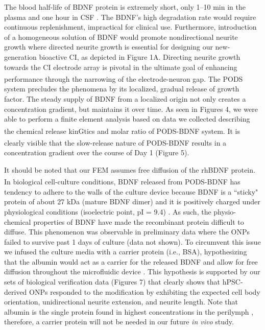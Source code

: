 \documentclass[review]{elsarticle}
\begin{document}
\indent The blood half-life of BDNF protein is extremely short, only 1–10 min in the plasma \cite{Poduslo1996,Sakane1997} and one hour in CSF \cite{Soderquist2009}. The BDNF's high degradation rate would require continuous replenishment, impractical for clinical use. Furthermore, introduction of a homogeneous solution of BDNF would promote nondirectional neurite growth where directed neurite growth is essential for designing our new-generation bioactive CI, as depicted in Figure 1A. Directing neurite growth towards the CI electrode array is pivotal in the ultimate goal of enhancing performance through the narrowing of the electrode-neuron gap. The PODS\textsuperscript{\textregistered} system precludes the phenomena by its localized, gradual release of growth factor. The steady supply of BDNF from a localized origin not only creates a concentration gradient, but maintains it over time. As seen in Figures 4, we were able to perform a finite element analysis based on data we collected describing the chemical release kinGtics and molar ratio of PODS\textsuperscript{\textregistered}-BDNF system. It is clearly visible that the slow-release nature of PODS\textsuperscript{\textregistered}-BDNF results in a concentration gradient over the course of Day 1 (Figure 5). 

\indent It should be noted that our FEM assumes free diffusion of the rhBDNF protein. In biological cell-culture conditions, BDNF released from PODS\textsuperscript{\textregistered}-BDNF has tendency to adhere to the walls of the culture device because BDNF is a ``sticky" protein of about 27 kDa (mature BDNF dimer) and it is positively charged under physiological conditions (isoelectric point, pI = 9.4) \cite{Sasi2017}. As such, the physio-chemical properties of BDNF have made the recombinant protein difficult to diffuse. This phenomenon was observable in preliminary data where the ONPs failed to survive past 1 days of culture (data not shown). To circumvent this issue we infused the culture media with a carrier protein (i.e., BSA), hypothesizing that the albumin would act as a carrier for the released BDNF and allow for free diffusion throughout the microfluidic device \cite{Li2010}. This hypothesis is supported by our sets of biological verification data (Figures 7) that clearly shows that hPSC-derived ONPs responded to the modification by exhibiting the expected cell body orientation, unidirectional neurite extension, and neurite length. Note that albumin is the single protein found in highest concentrations in the perilymph \cite{Swan2009}, therefore, a carrier protein will not be needed in our future \textit{in vivo} study.  
\end{document}
